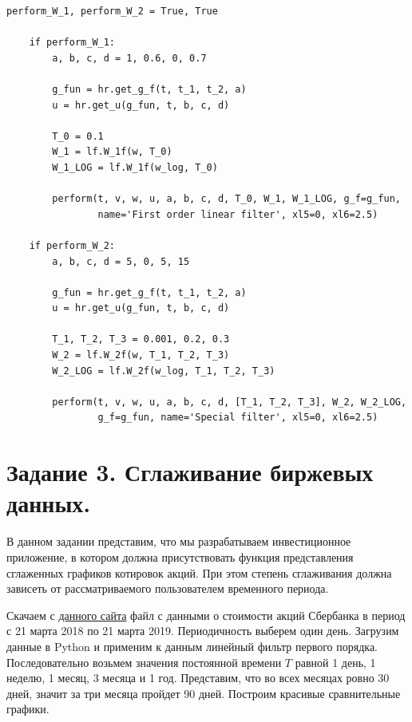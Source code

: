 \documentclass[a4paper, 12pt]{article}
\begin{document}
\begin{lstlisting}[label=l2, caption={Алгоритм, использующий приведенные ранее программы.}]
    perform_W_1, perform_W_2 = True, True

    if perform_W_1:
        a, b, c, d = 1, 0.6, 0, 0.7

        g_fun = hr.get_g_f(t, t_1, t_2, a)
        u = hr.get_u(g_fun, t, b, c, d)

        T_0 = 0.1
        W_1 = lf.W_1f(w, T_0)
        W_1_LOG = lf.W_1f(w_log, T_0)

        perform(t, v, w, u, a, b, c, d, T_0, W_1, W_1_LOG, g_f=g_fun, 
                name='First order linear filter', xl5=0, xl6=2.5)

    if perform_W_2:
        a, b, c, d = 5, 0, 5, 15

        g_fun = hr.get_g_f(t, t_1, t_2, a)
        u = hr.get_u(g_fun, t, b, c, d)

        T_1, T_2, T_3 = 0.001, 0.2, 0.3
        W_2 = lf.W_2f(w, T_1, T_2, T_3)
        W_2_LOG = lf.W_2f(w_log, T_1, T_2, T_3)

        perform(t, v, w, u, a, b, c, d, [T_1, T_2, T_3], W_2, W_2_LOG,
                g_f=g_fun, name='Special filter', xl5=0, xl6=2.5)
    \end{lstlisting}

    
    \section{Задание 3. Сглаживание биржевых данных.}
    В данном задании представим, что мы разрабатываем инвестиционное приложение, в котором должна
    присутствовать функция представления сглаженных графиков котировок акций. При этом степень
    сглаживания должна зависеть от рассматриваемого пользователем временного периода.


    Скачаем с \href{https://www.finam.ru/quote/moex/sber/export/}{данного сайта} файл с данными о
    стоимости акций Сбербанка в период с 21 марта 2018 по 21 марта 2019. Периодичность выберем один день.
    Загрузим данные в Python и применим к данным линейный фильтр первого порядка. Последовательно возьмем
    значения постоянной времени $T$ равной 1 день, 1 неделю, 1 месяц, 3 месяца и 1 год. Представим, что
    во всех месяцах ровно 30 дней, значит за три месяца пройдет 90 дней. Построим красивые сравнительные графики.
\end{document}
